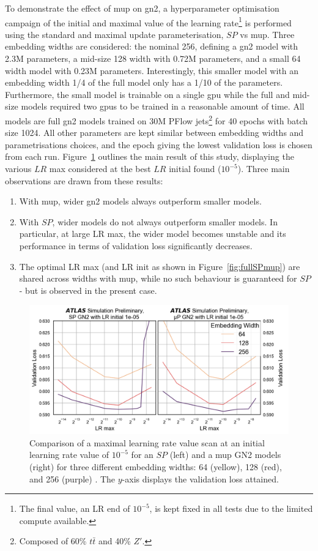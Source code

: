To demonstrate the effect of \gls{mup} on \gls{gn2}, a hyperparameter optimisation campaign of the initial and maximal value of the learning rate\footnote{The final value, an LR end of $10^{-5}$, is kept fixed in all tests due to the limited compute available.} is performed using the standard and maximal update parameterisation, $SP$ vs \gls{mup}. Three embedding widths are considered: the nominal 256, defining a \gls{gn2} model with 2.3M parameters, a mid-size 128 width with 0.72M parameters, and a small 64 width model with 0.23M parameters. Interestingly, this smaller model with an embedding width 1/4 of the full model only has a 1/10 of the parameters. Furthermore, the small model is trainable on a single \gls{gpu} while the full and mid-size models required two \glspl{gpu} to be trained in a reasonable amount of time. All models are full \gls{gn2} models trained on 30M PFlow jets\footnote{Composed of 60\% $t\bar{t}$ and 40\% $Z'$.} for 40 epochs with batch size 1024. All other parameters are kept similar between embedding widths and parametrisations choices, and the epoch giving the lowest validation loss is chosen from each run. Figure~\ref{fig:maincompmupsp} outlines the main result of this study, displaying the various $LR$ max considered at the best $LR$ initial found ($10^{-5}$). Three main observations are drawn from these results:
\begin{enumerate}
  \item With \gls{mup}, wider \gls{gn2} models always outperform smaller models. 
  \item With $SP$, wider models do not always outperform smaller models. In particular, at large LR max, the wider model becomes unstable and its performance in terms of validation loss significantly decreases.
  \item The optimal LR max (and LR init as shown in Figure~\ref{fig:fullSPmup}) are shared across widths with \gls{mup}, while no such behaviour is guaranteed for $SP$ - but is observed in the present case.
\end{enumerate}

\begin{figure}[h!]
  \centering
  \includegraphics[width=\textwidth]{Images/FTAG/GN/HPO/maincompmupsp.png}
  \caption{Comparison of a maximal learning rate value scan at an initial learning rate value of $10^{-5}$ for an $SP$ (left) and a \gls{mup} GN2 models (right) for three different embedding widths: 64 (yellow), 128 (red), and 256 (purple) \cite{publicplotMUP}. The $y$-axis displays the validation loss attained.}
  \label{fig:maincompmupsp}
\end{figure} 

